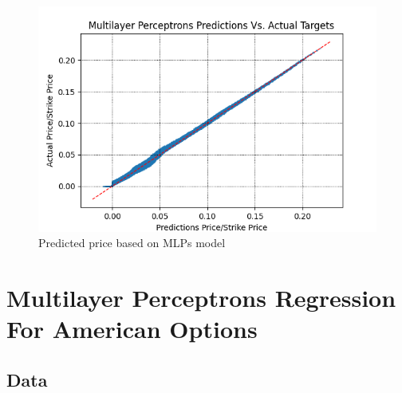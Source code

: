 \begin{figure}[H]
\centering
\includegraphics{Figures/PredictionOutMoneyEuroC.png}
\decoRule
\caption[MLPs Predictions Vs. Actual Prices]{Predicted price based on MLPs model}
\label{fig:MLPsOutMoneyEuroC}
\end{figure}





\section{Multilayer Perceptrons Regression For American Options}

\subsection{Data}

